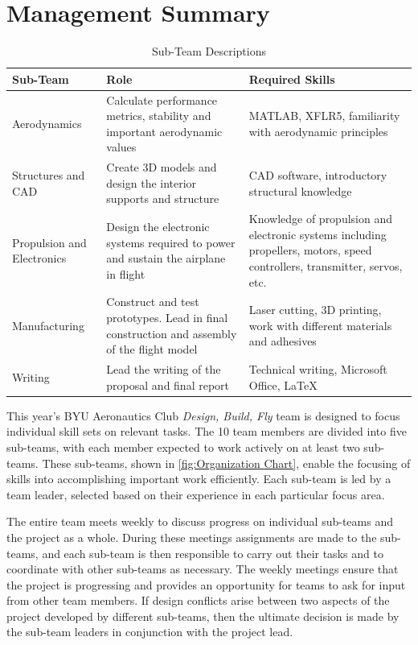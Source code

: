 \documentclass[proposal]{byu-aero}
\begin{document}
\section{Management Summary}
\label{sec:ManagementSummary}

\begin{table}[h!]
	\centering
	\renewcommand*{\arraystretch}{1.1}
	\caption{Sub-Team Descriptions}
	\label{tab:Roles}
	\begin{tabular}{ |m{1.7in}|m{2.5in}|m{2in}| }
		\hline
		\rowcolor{BYUbluemid}
		{Sub-Team} & {Role} & {Required Skills} \\ 
		\hline
		{Aerodynamics} & Calculate performance metrics, stability and important aerodynamic values & MATLAB, XFLR5, familiarity with aerodynamic principles\\
		\hline
		{Structures and CAD} & Create 3D models and design the interior supports and structure & CAD software, introductory structural knowledge\\ 
		\hline
		{Propulsion and Electronics} & Design the electronic systems required to power and sustain the airplane in flight & Knowledge of propulsion and electronic systems including propellers, motors, speed controllers, transmitter, servos, etc. \\ 
		\hline
		{Manufacturing} & Construct and test prototypes. Lead in final construction and assembly of the flight model & Laser cutting, 3D printing, work with different materials and adhesives  \\ 
		\hline
		{Writing} & Lead the writing of the proposal and final report & Technical writing, Microsoft Office, \LaTeX \\
		\hline
	\end{tabular}
\end{table}
This year's BYU Aeronautics Club \textit{Design, Build, Fly} team is designed to focus individual skill sets on relevant tasks. The 10 team members are divided into five sub-teams, with each member expected to work actively on at least two sub-teams. These sub-teams, shown in \cref{fig:Organization Chart}, enable the focusing of skills into accomplishing important work efficiently. Each sub-team is led by a team leader, selected based on their experience in each particular focus area.

The entire team meets weekly to discuss progress on individual sub-teams and the project as a whole. During these meetings assignments are made to the sub-teams, and each sub-team is then responsible to carry out their tasks and to coordinate with other sub-teams as necessary. The weekly meetings ensure that the project is progressing and provides an opportunity for teams to ask for input from other team members. If design conflicts arise between two aspects of the project developed by different sub-teams, then the ultimate decision is made by the sub-team leaders in conjunction with the project lead.
\end{document}
